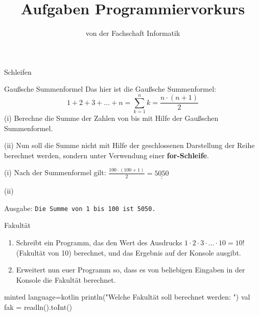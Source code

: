 
\title{Aufgaben Programmiervorkurs}
\subtitle{von der Fachschaft Informatik\hfill\ptitle}

\maketitle{}

\begin{task}[points=auto]{Schleifen}
    \begin{subtask*}[points=0]{Gaußsche Summenformel }
        Das hier ist die Gaußsche Summenformel:
        $$1+2+3+\ldots+n = \sum_{k=1}^nk=\frac{n\cdot(n+1)}{2}$$
        (i) Berechne die Summe der Zahlen von  bis  mit Hilfe der Gaußschen Summenformel.

        (ii) Nun soll die Summe nicht mit Hilfe der geschlossenen Darstellung der Reihe berechnet werden, sondern unter Verwendung einer \textbf{for-Schleife}.

        \begin{solution}
            (i) Nach der Summenformel gilt: $\frac{100\cdot(100+1)}{2} = \underline{\underline{5050}}$

            (ii) 
            Ausgabe: \texttt{Die Summe von 1 bis 100 ist 5050.}
        \end{solution}
    \end{subtask*}
    \begin{subtask*}[points=0]{Fakultät }
        \begin{enumerate}
            \item Schreibt ein Programm, das den Wert des Ausdrucks $1   \cdot \ldots {} = 10!$ (Fakultät von 10) berechnet, und das Ergebnis auf der Konsole ausgibt.
            \item Erweitert nun euer Programm so, dass es von beliebigen Eingaben in der Konsole die Fakultät berechnet.
        \end{enumerate}

        \begin{solution}
            \begin{codeBlock}[]{minted language=kotlin}
            println("Welche Fakultät soll berechnet werden: ")
            val fak = readln().toInt()


\end{codeBlock}
\end{solution}
\end{subtask*}
\end{task}
